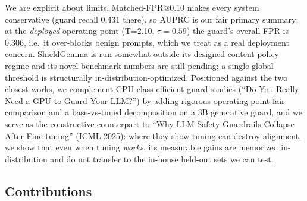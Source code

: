 \documentclass[sigconf,nonacm]{acmart}
\begin{document}
We are explicit about limits. Matched-FPR@0.10 makes every system conservative (guard recall 0.431 there), so AUPRC is our fair primary summary; at the \emph{deployed} operating point (T=2.10, $\tau=0.59$) the guard's overall FPR is 0.306, i.e.\ it over-blocks benign prompts, which we treat as a real deployment concern. ShieldGemma is run somewhat outside its designed content-policy regime and its novel-benchmark numbers are still pending; a single global threshold is structurally in-distribution-optimized. Positioned against the two closest works, we complement CPU-class efficient-guard studies (``Do You Really Need a GPU to Guard Your LLM?'') by adding rigorous operating-point-fair comparison and a base-vs-tuned decomposition on a 3B generative guard, and we serve as the constructive counterpart to ``Why LLM Safety Guardrails Collapse After Fine-tuning'' (ICML 2025): where they show tuning can destroy alignment, we show that even when tuning \emph{works}, its measurable gains are memorized in-distribution and do not transfer to the in-house held-out sets we can test.

\subsection{Contributions}
\end{document}
